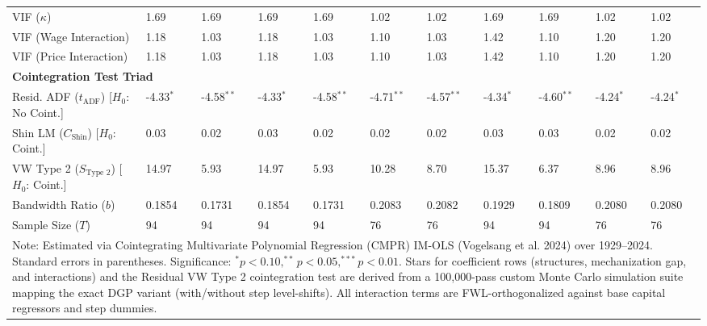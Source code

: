 \begin{table}[H]
\begin{tabular}{p{3.5cm}p{1.0cm}p{1.0cm}p{1.0cm}p{1.0cm}p{1.0cm}p{1.0cm}p{1.0cm}p{1.0cm}p{1.0cm}p{1.0cm}}
VIF ($\kappa$) & 1.69 & 1.69 & 1.69 & 1.69 & 1.02 & 1.02 & 1.69 & 1.69 & 1.02 & 1.02 \\
VIF (Wage Interaction) & 1.18 & 1.03 & 1.18 & 1.03 & 1.10 & 1.03 & 1.42 & 1.10 & 1.20 & 1.20 \\
VIF (Price Interaction) & 1.18 & 1.03 & 1.18 & 1.03 & 1.10 & 1.03 & 1.42 & 1.10 & 1.20 & 1.20 \\
\midrule
\multicolumn{11}{l}{\textbf{Cointegration Test Triad}} \\
Resid. ADF ($t_{\text{ADF}}$) [$H_0$: No Coint.] & -4.33$^{*}$ & -4.58$^{**}$ & -4.33$^{*}$ & -4.58$^{**}$ & -4.71$^{**}$ & -4.57$^{**}$ & -4.34$^{*}$ & -4.60$^{**}$ & -4.24$^{*}$ & -4.24$^{*}$ \\
Shin LM ($C_{\text{Shin}}$) [$H_0$: Coint.] & 0.03 & 0.02 & 0.03 & 0.02 & 0.02 & 0.02 & 0.03 & 0.03 & 0.02 & 0.02 \\
VW Type 2 ($S_{\text{Type 2}}$) [$H_0$: Coint.] & 14.97 & 5.93 & 14.97 & 5.93 & 10.28 & 8.70 & 15.37 & 6.37 & 8.96 & 8.96 \\
\midrule
Bandwidth Ratio ($b$) & 0.1854 & 0.1731 & 0.1854 & 0.1731 & 0.2083 & 0.2082 & 0.1929 & 0.1809 & 0.2080 & 0.2080 \\
Sample Size ($T$) & 94 & 94 & 94 & 94 & 76 & 76 & 94 & 94 & 76 & 76 \\
\bottomrule
\multicolumn{11}{p{15cm}}{\footnotesize Note: Estimated via Cointegrating Multivariate Polynomial Regression (CMPR) IM-OLS (Vogelsang et al. 2024) over 1929--2024. Standard errors in parentheses. Significance: $^* p < 0.10, ^{**} p < 0.05, ^{***} p < 0.01$. Stars for coefficient rows (structures, mechanization gap, and interactions) and the Residual VW Type 2 cointegration test are derived from a 100,000-pass custom Monte Carlo simulation suite mapping the exact DGP variant (with/without step level-shifts). All interaction terms are FWL-orthogonalized against base capital regressors and step dummies.}
\end{tabular}
\end{table}

